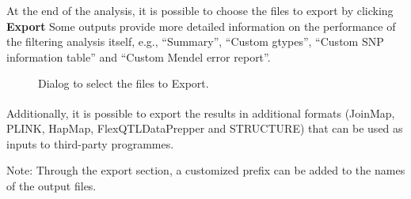 \documentclass[a4paper,11pt,english]{article}
\newcommand{\reg}{\textsuperscript{\textregistered}}
\begin{document}
At the end of the analysis, it is possible to choose the files to export by clicking \textbf{Export}
Some outputs provide more detailed information on the performance of the filtering analysis itself,
e.g.,
``Summary'', ``Custom gtypes'', ``Custom SNP information table'' and ``Custom Mendel error report''.
\begin{figure}[H]
\centering
\capstart

\caption{Dialog to select the files to Export.}\end{figure}

Additionally, it is possible to export the results in additional formats (JoinMap\reg, PLINK,
HapMap, FlexQTL\texttrademark  DataPrepper and STRUCTURE) that can be used as inputs to third-party
programmes.

Note: Through the export section,  a customized prefix can be added to the names of the
output files.
\end{document}
